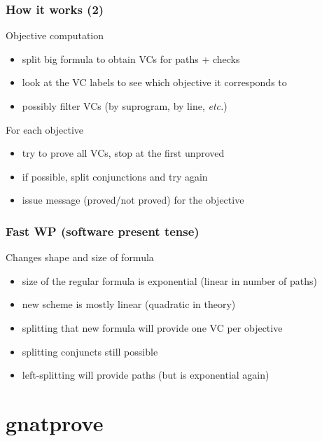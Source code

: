 \documentclass{beamer}
\newcommand{\etc}{\textit{etc.}\xspace}
\newenvironment{specialframe}{%
  \begin{frame}[fragile,environment=specialframe]}{\end{frame}}
\begin{document}
\begin{specialframe}\frametitle{How it works (2)}

   \begin{block}{Objective computation}
      \begin{itemize}
         \item split big formula to obtain VCs for paths + checks
         \item look at the VC labels to see which objective it corresponds to
         \item possibly filter VCs (by suprogram, by line, \etc)
      \end{itemize}
   \end{block}
   \begin{block}{For each objective}
      \begin{itemize}
         \item try to prove all VCs, stop at the first unproved
         \item if possible, split conjunctions and try again
         \item issue message (proved/not proved) for the objective
      \end{itemize}
   \end{block}

\end{specialframe}

\begin{specialframe}\frametitle{Fast WP (software present tense)}

   Changes shape and size of formula
      \begin{itemize}
      \item size of the regular formula is exponential (linear in number of paths)
      \item new scheme is mostly linear (quadratic in theory)
      \item splitting that new formula will provide one VC per objective
      \item splitting conjuncts still possible
      \item left-splitting will provide paths (but is exponential again)
      \end{itemize}

\end{specialframe}

\section{gnatprove}
\end{document}
